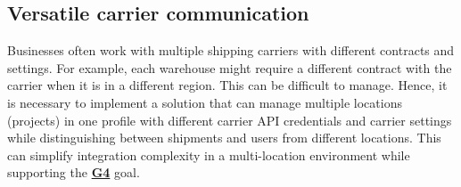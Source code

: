 \subsection{Versatile carrier communication}
Businesses often work with multiple shipping carriers with different contracts and settings. 
For example, each warehouse might require a different contract with the carrier when it is in a different region.
This can be difficult to manage. 
Hence, it is necessary to implement a solution that can manage multiple locations (projects) in one profile with different carrier API credentials and carrier settings while distinguishing between shipments and users from different locations.
This can simplify integration complexity in a multi-location environment while supporting the \hyperref[subsec:project-goals]{\textbf{G4}} goal.

% 

